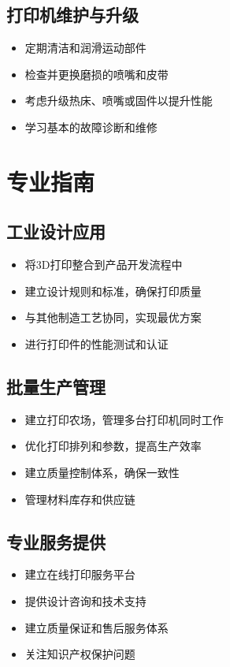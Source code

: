 \documentclass[12pt,UTF8]{ctexbook}
\begin{document}
\subsection{打印机维护与升级}
\begin{itemize}
\item 定期清洁和润滑运动部件
\item 检查并更换磨损的喷嘴和皮带
\item 考虑升级热床、喷嘴或固件以提升性能
\item 学习基本的故障诊断和维修
\end{itemize}

\section{专业指南}

\subsection{工业设计应用}
\begin{itemize}
\item 将3D打印整合到产品开发流程中
\item 建立设计规则和标准，确保打印质量
\item 与其他制造工艺协同，实现最优方案
\item 进行打印件的性能测试和认证
\end{itemize}

\subsection{批量生产管理}
\begin{itemize}
\item 建立打印农场，管理多台打印机同时工作
\item 优化打印排列和参数，提高生产效率
\item 建立质量控制体系，确保一致性
\item 管理材料库存和供应链
\end{itemize}

\subsection{专业服务提供}
\begin{itemize}
\item 建立在线打印服务平台
\item 提供设计咨询和技术支持
\item 建立质量保证和售后服务体系
\item 关注知识产权保护问题
\end{itemize}
\end{document}
